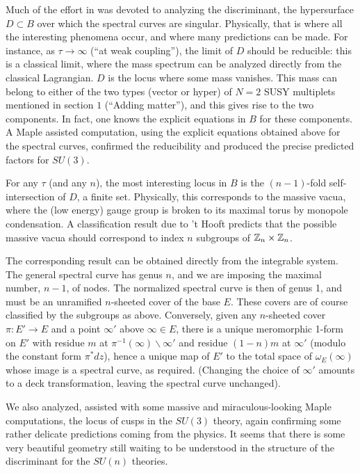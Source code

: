 Much of the effort in \cite{DW} was 
devoted to analyzing the
discriminant, the hypersurface 
$D\subset B$ over which the
spectral curves are singular.  Physically, 
that is where all the
interesting phenomena occur, and where many 
predictions can be
made.  For instance, as $\tau\to\infty$ 
(``at weak coupling''), the
limit of $D$ should be reducible:  this is a 
classical limit, where the
mass spectrum can be analyzed directly from 
the classical Lagrangian.
$D$ is the locus where some mass vanishes.  
This mass can belong
to either of the two types (vector or hyper) 
of $N = 2$ SUSY multiplets mentioned in section $1$ 
(``Adding matter''), 
and this gives rise to the two components.  In fact, one knows 
the explicit equations in $B$ 
for these components.  A Maple  assisted 
computation, using the explicit
equations obtained above for the spectral 
curves, confirmed the reducibility and
produced the precise predicted factors for $SU(3)$.  

For any $\tau$ (and any $n$), the most interesting 
locus in $B$ is the
$(n-1)$-fold self-intersection of $D$, a finite set.  
Physically, this
corresponds to the massive vacua, where the 
(low energy) gauge group
is broken to its maximal torus by monopole 
condensation.  A classification
result due to 't Hooft predicts that the possible 
massive vacua should correspond to
index $n$ subgroups of ${\Bbb Z}_n\times{\Bbb Z}_n$.

The corresponding result can be obtained directly 
from the integrable system.  
The general spectral curve has genus $n$, and we 
are imposing the maximal number,
$n-1$, of nodes.  The normalized spectral curve 
is then of genus 1, and
must be an unramified $n$-sheeted cover of the 
base $E$.  These covers are 
of course classified by the subgroups as above.  
Conversely, given any
$n$-sheeted cover $\pi:E'\to E$ and a point 
$\infty'$ above $\infty\in E$, there
is a unique meromorphic 1-form on $E'$ with 
residue $m$ at
$\pi^{-1}(\infty)\backslash\infty'$ and 
residue $(1-n)m$ at $\infty'$ (modulo 
the constant form $\pi^*dz$), hence a 
unique map of $E'$ to the total space
of $\omega_E(\infty)$ whose image is a 
spectral curve, as required.  (Changing
the choice of $\infty'$ amounts to a deck 
transformation, leaving the
spectral curve unchanged).

We also analyzed, assisted with some massive 
and miraculous-looking Maple 
computations, the locus of cusps in the $SU(3)$ 
theory, again confirming some
rather delicate predictions coming from the 
physics.  It seems that there is
some very beautiful geometry still waiting 
to be understood in the 
structure of the discriminant for 
the $SU(n)$ theories.



